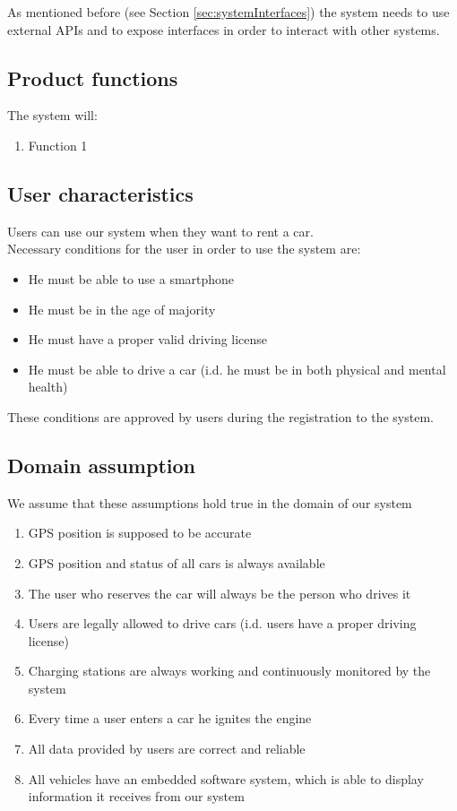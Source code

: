 	As mentioned before (see Section \ref{sec:systemInterfaces}) the system needs to use external APIs and to expose interfaces in order to interact with other systems.
	
\subsection{Product functions}
	The system will:
	\begin{enumerate}[label=\textbf{F\arabic*.}]
		\item Function 1
	\end{enumerate}

\subsection{User characteristics}
	Users can use our system when they want to rent a car.\\
	Necessary conditions for the user in order to use the system are:
	\begin{itemize}
		\item He must be able to use a smartphone
		\item He must be in the age of majority
		\item He must have a proper valid driving license
		\item He must be able to drive a car (i.d. he must be in both physical and mental health)
	\end{itemize}
	These conditions are approved by users during the registration to the system.

\subsection{Domain assumption}
	We assume that these assumptions hold true in the domain of our system 
	\begin{enumerate}[label=\textbf{DA\arabic*}]
		\item GPS position is supposed to be accurate
		\item GPS position and status of all cars is always available
		\item The user who reserves the car will always be the person who drives it
		\item Users are legally allowed to drive cars (i.d. users have a proper driving license)
		\item Charging stations are always working and continuously monitored by the system
		\item {}Every time a user enters a car he ignites the engine
		\item All data provided by users are correct and reliable
		\item All vehicles have an embedded software system, which is able to display information it receives from our system
	\end{enumerate}